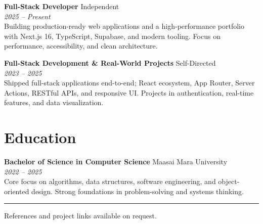 \documentclass[11pt,a4paper]{article}
\begin{document}
\textbf{Full-Stack Developer} \hfill Independent\\
\textit{2025 -- Present}\\
Building production-ready web applications and a high-performance portfolio with Next.js 16, TypeScript, Supabase, and modern tooling. Focus on performance, accessibility, and clean architecture.

\vspace{0.4em}
\textbf{Full-Stack Development \& Real-World Projects} \hfill Self-Directed\\
\textit{2023 -- 2025}\\
Shipped full-stack applications end-to-end; React ecosystem, App Router, Server Actions, RESTful APIs, and responsive UI. Projects in authentication, real-time features, and data visualization.

\section*{Education}

\textbf{Bachelor of Science in Computer Science} \hfill Maasai Mara University\\
\textit{2022 -- 2025}\\
Core focus on algorithms, data structures, software engineering, and object-oriented design. Strong foundations in problem-solving and systems thinking.

\vspace{1em}
\hrule
\small References and project links available on request.
\end{document}
